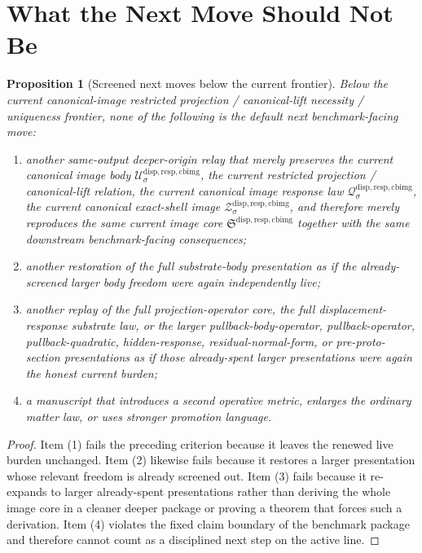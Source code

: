 \documentclass[11pt]{article}
\newcommand{\CurrentBodyImageCore}{\mathfrak S^{\mathrm{disp,resp,cbimg}}}
\newcommand{\CanonicalImageBody}[1]{\mathcal U_{#1}^{\mathrm{disp,resp,cbimg}}}
\newcommand{\CanonicalImageShell}[1]{\mathcal Z_{#1}^{\mathrm{disp,resp,cbimg}}}
\newcommand{\CanonicalImageResponseLaw}[1]{\mathscr Q_{#1}^{\mathrm{disp,resp,cbimg}}}
\newtheorem{proposition}{Proposition}
\begin{document}
\section{What the Next Move Should Not Be}

\begin{proposition}[Screened next moves below the current frontier]
Below the current canonical-image restricted projection / canonical-lift necessity / uniqueness frontier, none of the following is the default next benchmark-facing move:
\begin{enumerate}
    \item another same-output deeper-origin relay that merely preserves the current canonical image body \(\CanonicalImageBody{\sigma}\), the current restricted projection / canonical-lift relation, the current canonical image response law \(\CanonicalImageResponseLaw{\sigma}\), the current canonical exact-shell image \(\CanonicalImageShell{\sigma}\), and therefore merely reproduces the same current image core \(\CurrentBodyImageCore\) together with the same downstream benchmark-facing consequences;
    \item another restoration of the full substrate-body presentation as if the already-screened larger body freedom were again independently live;
    \item another replay of the full projection-operator core, the full displacement-response substrate law, or the larger pullback-body-operator, pullback-operator, pullback-quadratic, hidden-response, residual-normal-form, or pre-proto-section presentations as if those already-spent larger presentations were again the honest current burden;
    \item a manuscript that introduces a second operative metric, enlarges the ordinary matter law, or uses stronger promotion language.
\end{enumerate}
\end{proposition}

\begin{proof}
Item (1) fails the preceding criterion because it leaves the renewed live burden unchanged. Item (2) likewise fails because it restores a larger presentation whose relevant freedom is already screened out. Item (3) fails because it re-expands to larger already-spent presentations rather than deriving the whole image core in a cleaner deeper package or proving a theorem that forces such a derivation. Item (4) violates the fixed claim boundary of the benchmark package and therefore cannot count as a disciplined next step on the active line.
\end{proof}
\end{document}
